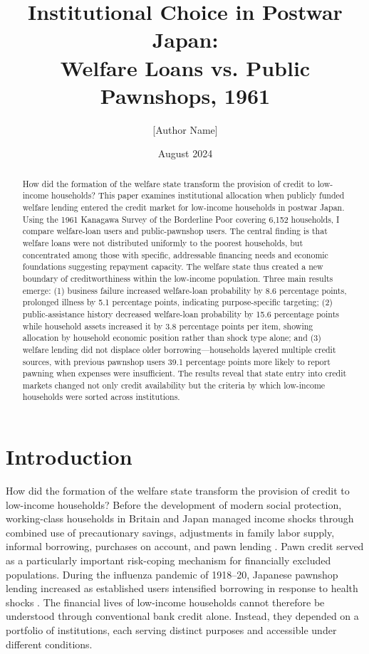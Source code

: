 \documentclass[12pt,a4paper]{article}
\title{Institutional Choice in Postwar Japan:\\
Welfare Loans vs. Public Pawnshops, 1961}
\author{[Author Name]}
\date{August 2024}
\begin{document}
\maketitle

\begin{abstract}
How did the formation of the welfare state transform the provision of credit to low-income households? This paper examines institutional allocation when publicly funded welfare lending entered the credit market for low-income households in postwar Japan. Using the 1961 Kanagawa Survey of the Borderline Poor covering 6,152 households, I compare welfare-loan users and public-pawnshop users. The central finding is that welfare loans were not distributed uniformly to the poorest households, but concentrated among those with specific, addressable financing needs and economic foundations suggesting repayment capacity. The welfare state thus created a new boundary of creditworthiness within the low-income population. Three main results emerge: (1) business failure increased welfare-loan probability by 8.6 percentage points, prolonged illness by 5.1 percentage points, indicating purpose-specific targeting; (2) public-assistance history decreased welfare-loan probability by 15.6 percentage points while household assets increased it by 3.8 percentage points per item, showing allocation by household economic position rather than shock type alone; and (3) welfare lending did not displace older borrowing—households layered multiple credit sources, with previous pawnshop users 39.1 percentage points more likely to report pawning when expenses were insufficient. The results reveal that state entry into credit markets changed not only credit availability but the criteria by which low-income households were sorted across institutions.
\end{abstract}

\newpage

\section{Introduction}

How did the formation of the welfare state transform the provision of credit to low-income households? Before the development of modern social protection, working-class households in Britain and Japan managed income shocks through combined use of precautionary savings, adjustments in family labor supply, informal borrowing, purchases on account, and pawn lending \citep{ScottWalker2012, Ogasawara2024}. Pawn credit served as a particularly important risk-coping mechanism for financially excluded populations. During the influenza pandemic of 1918--20, Japanese pawnshop lending increased as established users intensified borrowing in response to health shocks \citep{Inoue2021}. The financial lives of low-income households cannot therefore be understood through conventional bank credit alone. Instead, they depended on a portfolio of institutions, each serving distinct purposes and accessible under different conditions.
\end{document}
